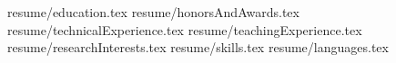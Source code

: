 \documentclass[11pt, a4paper]{MostafaGhadimiCV}
\newcommand*{\sectiondir}{resume/}
\begin{document}
\makecvheader
{resume/education.tex}
{resume/honorsAndAwards.tex}
{resume/technicalExperience.tex}
{resume/teachingExperience.tex}
{resume/researchInterests.tex}
{resume/skills.tex}
{resume/languages.tex}
\end{document}
